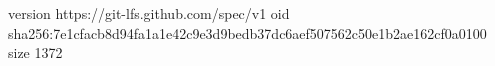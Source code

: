version https://git-lfs.github.com/spec/v1
oid sha256:7e1cfacb8d94fa1a1e42c9e3d9bedb37dc6aef507562c50e1b2ae162cf0a0100
size 1372
